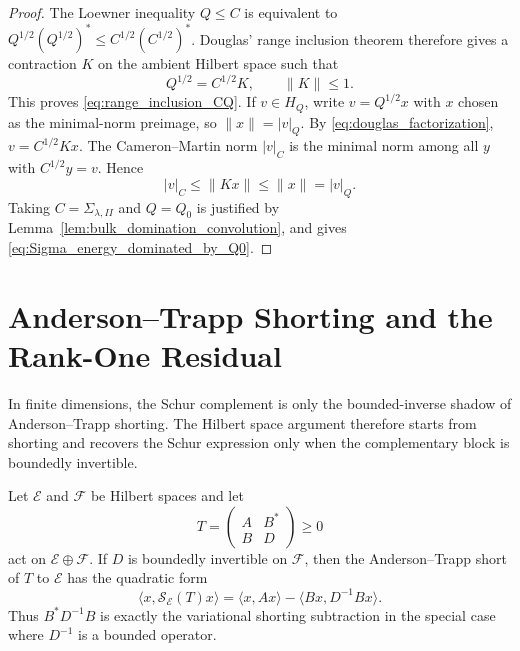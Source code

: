 \begin{proof}
The Loewner inequality $Q\le C$ is equivalent to
$Q^{1/2}(Q^{1/2})^*\le C^{1/2}(C^{1/2})^*$.  Douglas' range inclusion theorem
therefore gives a contraction $K$ on the ambient Hilbert space such that
\begin{equation}
  Q^{1/2}=C^{1/2}K,
  \qquad \|K\|\le1.
  \label{eq:douglas_factorization}
\end{equation}
This proves \eqref{eq:range_inclusion_CQ}.  If $v\in H_Q$, write
$v=Q^{1/2}x$ with $x$ chosen as the minimal-norm preimage, so
$\|x\|=|v|_Q$.  By \eqref{eq:douglas_factorization},
$v=C^{1/2}Kx$.  The Cameron--Martin norm $|v|_C$ is the minimal norm among all
$y$ with $C^{1/2}y=v$.  Hence
\[
  |v|_C\le \|Kx\|\le\|x\|=|v|_Q.
\]
Taking $C=\Sigma_{\lambda,II}$ and $Q=Q_0$ is justified by
Lemma~\ref{lem:bulk_domination_convolution}, and gives
\eqref{eq:Sigma_energy_dominated_by_Q0}.
\end{proof}

\section{Anderson--Trapp Shorting and the Rank-One Residual}
\label{app:shorting_residual}

In finite dimensions, the Schur complement is only the bounded-inverse
shadow of Anderson--Trapp shorting.  The Hilbert space argument therefore
starts from shorting and recovers the Schur expression only when the
complementary block is boundedly invertible.

\begin{lemma}
\label{lem:schur_shadow_shorting}
Let $\mathcal{E}$ and $\mathcal{F}$ be Hilbert spaces and let
\[
  T=\begin{pmatrix}A&B^*\\B&D\end{pmatrix}\ge0
\]
act on $\mathcal{E}\oplus\mathcal{F}$.  If $D$ is boundedly invertible on
$\mathcal{F}$, then the Anderson--Trapp short of $T$ to $\mathcal{E}$ has the
quadratic form
\begin{equation}
  \langle x,\mathcal{S}_{\mathcal{E}}(T)x\rangle
  =
  \langle x,Ax\rangle-\langle Bx,D^{-1}Bx\rangle.
  \label{eq:short_shadow}
\end{equation}
Thus $B^*D^{-1}B$ is exactly the variational shorting subtraction in the special
case where $D^{-1}$ is a bounded operator.
\end{lemma}

